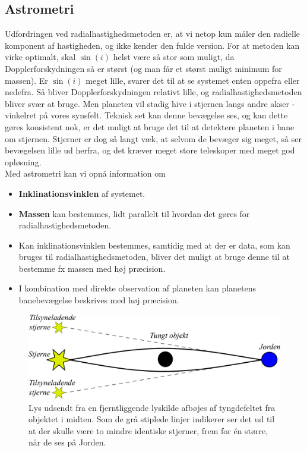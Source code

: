 \subsection*{Astrometri}
Udfordringen ved radialhastighedsmetoden er, at vi netop kun måler den radielle komponent af hastigheden, og ikke kender den fulde version. For at metoden kan virke optimalt, skal $\sin(i)$ helst være så stor som muligt, da Dopplerforskydningen så er størst (og man får et størst muligt minimum for massen). Er $\sin(i)$ meget lille, svarer det til at se systemet enten oppefra eller nedefra. Så bliver Dopplerforskydningen relativt lille, og radialhastighedsmetoden bliver svær at bruge. Men planeten vil stadig hive i stjernen langs andre akser - vinkelret på vores synsfelt. Teknisk set kan denne bevægelse ses, og kan dette gøres konsistent nok, er det muligt at bruge det til at detektere planeten i bane om stjernen. Stjerner er dog så langt væk, at selvom de bevæger sig meget, så ser bevægelsen lille ud herfra, og det kræver meget store teleskoper med meget god opløsning. \\

Med astrometri kan vi opnå information om %
\begin{itemize}
    \item \textbf{Inklinationsvinklen} af systemet.
    \item \textbf{Massen} kan bestemmes, lidt parallelt til hvordan det gøres for radialhastighedsmetoden.
    \item Kan inklinationsvinklen bestemmes, samtidig med at der er data, som kan bruges til radialhastighedsmetoden, bliver det muligt at bruge denne til at bestemme fx massen med høj præcision.
    \item I kombination med direkte observation af planeten kan planetens banebevægelse beskrives med høj præcision.
\end{itemize}

\begin{figure}[h!]
    \centering
    \includegraphics[width=\textwidth]{Astrofysik/billeder/GravLinse.pdf}
    \caption{Lys udsendt fra en fjerntliggende lyskilde afbøjes af tyngdefeltet fra objektet i midten. Som de grå stiplede linjer indikerer ser det ud til at der skulle være to mindre identiske stjerner, frem for én større, når de ses på Jorden.}
    \label{fig:GravLinse}
\end{figure}

